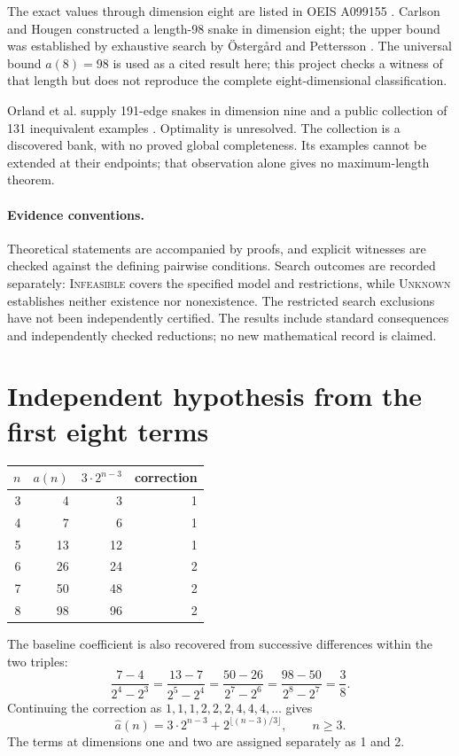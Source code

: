 \documentclass[11pt,a4paper]{article}
\theoremstyle{definition}
\theoremstyle{remark}
\begin{document}
The exact values through dimension eight are listed in OEIS A099155 \cite{oeis}. Carlson and Hougen constructed a length-98 snake in dimension eight; the upper bound was established by exhaustive search by Östergård and Pettersson \cite{ostergard}. The universal bound $a(8)=98$ is used as a cited result here; this project checks a witness of that length but does not reproduce the complete eight-dimensional classification.

Orland et al. supply 191-edge snakes in dimension nine and a public collection of 131 inequivalent examples \cite{orland,data}. Optimality is unresolved. The collection is a discovered bank, with no proved global completeness. Its examples cannot be extended at their endpoints; that observation alone gives no maximum-length theorem.

\paragraph{Evidence conventions.}
Theoretical statements are accompanied by proofs, and explicit witnesses are checked against the defining pairwise conditions. Search outcomes are recorded separately: \textsc{Infeasible} covers the specified model and restrictions, while \textsc{Unknown} establishes neither existence nor nonexistence. The restricted search exclusions have not been independently certified. The results include standard consequences and independently checked reductions; no new mathematical record is claimed.

\section{Independent hypothesis from the first eight terms}
\begin{center}
\begin{tabular}{rrrr}
\toprule
$n$ & $a(n)$ & $3\cdot2^{n-3}$ & correction\\
\midrule
3&4&3&1\\4&7&6&1\\5&13&12&1\\
6&26&24&2\\7&50&48&2\\8&98&96&2\\
\bottomrule
\end{tabular}
\end{center}
The baseline coefficient is also recovered from successive differences within the two triples:
\[
\frac{7-4}{2^4-2^3}=\frac{13-7}{2^5-2^4}
=\frac{50-26}{2^7-2^6}=\frac{98-50}{2^8-2^7}=\frac38.
\]
Continuing the correction as $1,1,1,2,2,2,4,4,4,\ldots$ gives
\begin{equation}\label{eq:model}
\widehat a(n)=3\cdot2^{n-3}+2^{\lfloor(n-3)/3\rfloor},\qquad n\ge3.
\end{equation}
The terms at dimensions one and two are assigned separately as 1 and 2.
\end{document}
